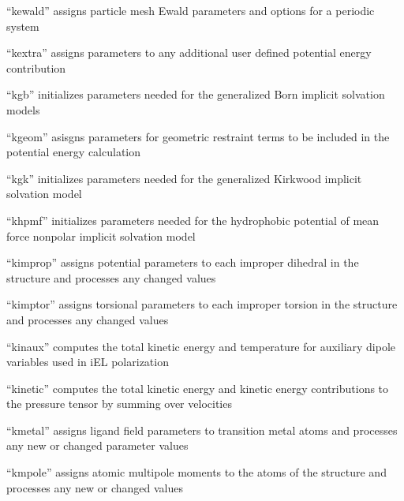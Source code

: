 \documentclass[letterpaper,11pt,english]{sphinxmanual}
\begin{document}

“kewald” assigns particle mesh Ewald parameters and options
for a periodic system


“kextra” assigns parameters to any additional user defined
potential energy contribution


“kgb” initializes parameters needed for the generalized
Born implicit solvation models


“kgeom” asisgns parameters for geometric restraint terms
to be included in the potential energy calculation


“kgk” initializes parameters needed for the generalized
Kirkwood implicit solvation model


“khpmf” initializes parameters needed for the hydrophobic
potential of mean force nonpolar implicit solvation model


“kimprop” assigns potential parameters to each improper
dihedral in the structure and processes any changed values


“kimptor” assigns torsional parameters to each improper
torsion in the structure and processes any changed values


“kinaux” computes the total kinetic energy and temperature
for auxiliary dipole variables used in iEL polarization


“kinetic” computes the total kinetic energy and kinetic energy
contributions to the pressure tensor by summing over velocities


“kmetal” assigns ligand field parameters to transition metal
atoms and processes any new or changed parameter values


“kmpole” assigns atomic multipole moments to the atoms of
the structure and processes any new or changed values
\end{document}
